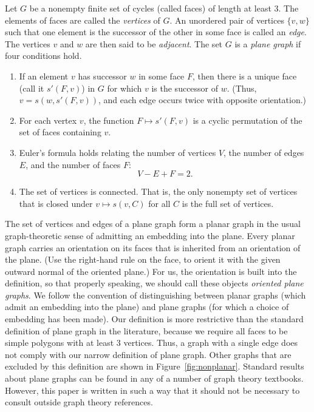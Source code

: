 \begin{definition}
Let $G$ be a nonempty finite set of cycles (called faces) of
length at least $3$. The elements of faces are called the {\it
vertices} of $G$. An unordered pair of vertices $\{v,w\}$ such
that one element is the successor of the other in some face is
called an {\it edge}. The vertices $v$ and $w$ are then said to be
{\it adjacent}. The set $G$ is a {\it plane graph} if four
conditions hold.
%
    \begin{enumerate}
    \item If an element $v$ has successor $w$ in some face $F$, then
there is a unique face (call it $s'(F,v)$) in $G$ for which $v$ is
the successor of $w$. (Thus, $v=s(w,s'(F,v))$, and each edge
occurs twice with opposite orientation.)
    \item  For each vertex $v$, the function $F\mapsto s'(F,v)$ is
    a cyclic permutation of the set of faces containing $v$.
    \item  Euler's formula holds relating the number of vertices $V$, the
number of edges $E$, and the number of faces $F$:
    $$V-E+F = 2.$$
    \item The set of vertices is connected.  That is, the only nonempty
    set of vertices that is closed under $v\mapsto s(v,C)$ for all $C$
    is the full set of vertices.
    \end{enumerate}
\end{definition}

\begin{remark} The set of vertices and edges of a plane graph form a planar
graph in the usual graph-theoretic sense of admitting an embedding
into the plane.  Every planar graph carries an orientation on its
faces that is inherited from an orientation of the plane. (Use the
right-hand rule on the face, to orient it with the given outward
normal of the oriented plane.)  For us, the orientation is built
into the definition, so that properly speaking, we should call
these objects {\it oriented plane graphs}.  We follow the
convention of distinguishing between planar graphs (which admit an
embedding into the plane) and plane graphs (for which a choice of
embedding has been made).  Our definition is more restrictive than
the standard definition of plane graph in the literature, because
we require all faces to be simple polygons with at least $3$
vertices.  Thus, a graph with a single edge does not comply with
our narrow definition of plane graph. Other graphs that are
excluded by this definition are shown in
Figure~\ref{fig:nonplanar}.  Standard results about plane graphs
can be found in any of a number of graph theory textbooks.
However, this paper is written in such a way that it should not be
necessary to consult outside graph theory references.
\end{remark}

